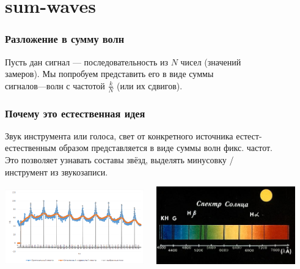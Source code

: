 \documentclass[11pt,aspectratio=169,svgnames]{beamer}
\begin{document}
\section{sum-waves}

\begin{frame} \frametitle{Разложение в сумму волн}
	Пусть дан сигнал — последовательность из \(N\) чисел (значений \\
	замеров). Мы попробуем представить его в виде суммы \\
	сигналов—волн с частотой \(\frac{k}{N}\) (или их сдвигов). \medskip

  \begin{center}  \end{center}
\end{frame}

\begin{frame} \frametitle{Почему это естественная идея}
  Звук инструмента или голоса, свет от конкретного источника естест-\\
  естественным образом представляется в виде суммы волн фикс. частот. \\
  Это позволяет узнавать составы звёзд, выделять минусовку / \\
  инструмент из звукозаписи.

\begin{center}
\includegraphics[width=0.45\textwidth]{img/spectre-guitar}\ \ \ 
\includegraphics[width=0.45\textwidth]{img/spectre-sun}
\end{center}
\end{frame}
\end{document}

